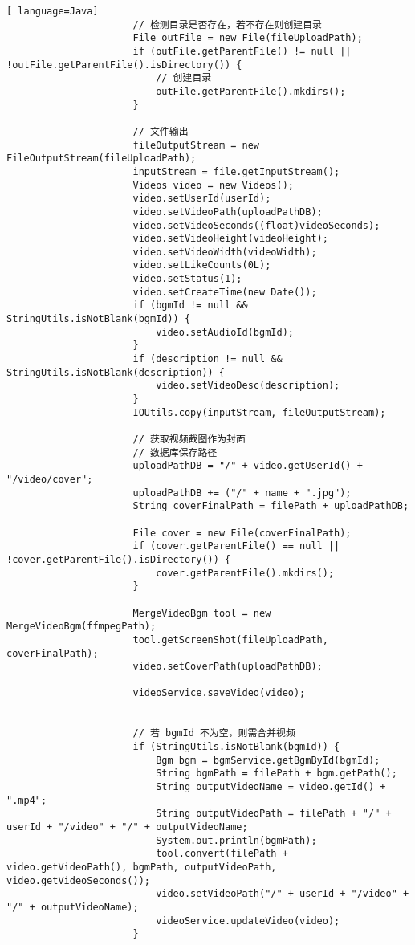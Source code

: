 \begin{lstlisting}[ language=Java]
                      // 检测目录是否存在，若不存在则创建目录
                      File outFile = new File(fileUploadPath);
                      if (outFile.getParentFile() != null || !outFile.getParentFile().isDirectory()) {
                          // 创建目录
                          outFile.getParentFile().mkdirs();
                      }
  
                      // 文件输出
                      fileOutputStream = new FileOutputStream(fileUploadPath);
                      inputStream = file.getInputStream();
                      Videos video = new Videos();
                      video.setUserId(userId);
                      video.setVideoPath(uploadPathDB);
                      video.setVideoSeconds((float)videoSeconds);
                      video.setVideoHeight(videoHeight);
                      video.setVideoWidth(videoWidth);
                      video.setLikeCounts(0L);
                      video.setStatus(1);
                      video.setCreateTime(new Date());
                      if (bgmId != null && StringUtils.isNotBlank(bgmId)) {
                          video.setAudioId(bgmId);
                      }
                      if (description != null && StringUtils.isNotBlank(description)) {
                          video.setVideoDesc(description);
                      }
                      IOUtils.copy(inputStream, fileOutputStream);
  
                      // 获取视频截图作为封面
                      // 数据库保存路径
                      uploadPathDB = "/" + video.getUserId() + "/video/cover";
                      uploadPathDB += ("/" + name + ".jpg");
                      String coverFinalPath = filePath + uploadPathDB;
  
                      File cover = new File(coverFinalPath);
                      if (cover.getParentFile() == null || !cover.getParentFile().isDirectory()) {
                          cover.getParentFile().mkdirs();
                      }
  
                      MergeVideoBgm tool = new MergeVideoBgm(ffmpegPath);
                      tool.getScreenShot(fileUploadPath, coverFinalPath);
                      video.setCoverPath(uploadPathDB);
  
                      videoService.saveVideo(video);
  
  
                      // 若 bgmId 不为空，则需合并视频
                      if (StringUtils.isNotBlank(bgmId)) {
                          Bgm bgm = bgmService.getBgmById(bgmId);
                          String bgmPath = filePath + bgm.getPath();
                          String outputVideoName = video.getId() + ".mp4";
                          String outputVideoPath = filePath + "/" + userId + "/video" + "/" + outputVideoName;
                          System.out.println(bgmPath);
                          tool.convert(filePath + video.getVideoPath(), bgmPath, outputVideoPath, video.getVideoSeconds());
                          video.setVideoPath("/" + userId + "/video" + "/" + outputVideoName);
                          videoService.updateVideo(video);
                      }
  

\end{lstlisting}

